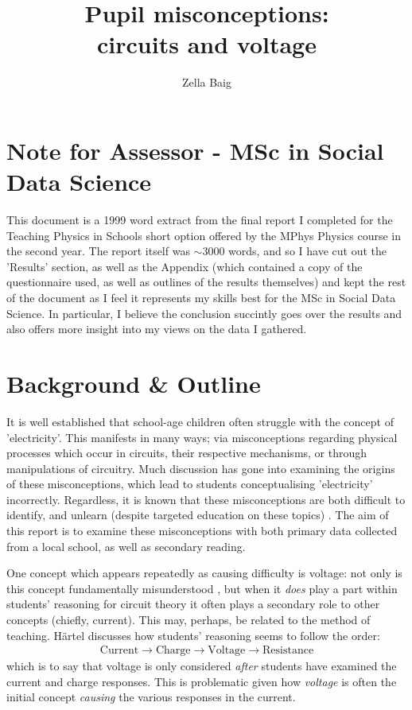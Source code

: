\documentclass[a4paper,openany,nobib]{tufte-book}
\title{Pupil misconceptions:\\ \noindent circuits and voltage}
\author{Zella Baig}
\begin{document}
\frontmatter
{\maketitle}
\tableofcontents
\thispagestyle{empty}
\mainmatter
\chapter{Note for Assessor - MSc in Social Data Science}
\setcounter{page}{1}
This document is a 1999 word extract from the final report I completed for the Teaching Physics in Schools short option offered by the MPhys Physics course in the second year. The report itself was $\sim$3000 words, and so I have cut out the 'Results' section, as well as the Appendix (which contained a copy of the questionnaire used, as well as outlines of the results themselves) and kept the rest of the document as I feel it represents my skills best for the MSc in Social Data Science. In particular, I believe the conclusion succintly goes over the results and also offers more insight into my views on the data I gathered.
\chapter{Background \& Outline}
It is well established that school-age children often struggle with the concept of {'electricity'\autocite{psillos}}.
This manifests in many ways;
via misconceptions regarding physical processes which occur in circuits, their respective mechanisms, or through manipulations of circuitry. Much discussion has gone into examining the origins of these misconceptions,
which lead to students conceptualising 'electricity' incorrectly.
Regardless, it is known that these misconceptions are both difficult to identify, and unlearn (despite targeted education on these {topics)
\autocite{lee2001}}.
The aim of this report is to examine these misconceptions with both primary data collected from a local school, as well as secondary reading.

One concept which appears repeatedly as causing difficulty is voltage: not only is this concept fundamentally {misunderstood \autocite{shipstone_children}}, but when it \emph{does} play a part within students' reasoning for circuit theory it often plays a secondary role to other concepts (chiefly, current).
This may, perhaps, be related to the method of teaching. 
Härtel discusses how students' reasoning seems to follow the {order\autocite{hartel82}}:
\begin{align*}
	\text{Current}\rightarrow \text{Charge} \rightarrow \text{Voltage} \rightarrow \text{Resistance}
\end{align*}
which is to say that voltage is only considered \emph{after} students have examined the current and charge responses. This is problematic given how \emph{voltage} is often the initial concept \emph{causing} the various responses in the current.
\end{document}
